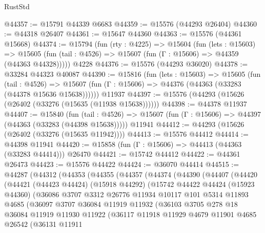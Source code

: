 \begin{lexlean}{RustStd}
\begin{coremodule}
@44357 := @15791 @44339 @6683
@44359 := @15576 (@44293 @26404)
@44360 := @44318 @26407
@44361 := @15647 @44360
@44363 := @15576 (@44361 @15668)
@44374 := @15794
    (fun (rty : @4225) =>
    @15604
      (fun (lets : @15603) =>
      @15605 (fun (tail : @4526) => @15607 (fun (Γ : @15606) => @44359 (@44363 @44328)))))
    @4228
@44376 := @15576 (@44293 @36020)
@44378 := @33284 @44323 @40087
@44390 := @15816
    (fun (lets : @15603) =>
    @15605
      (fun (tail : @4526) =>
      @15607 (fun (Γ : @15606) => @44376 (@44363 (@33283 (@44378 @15636 @15638))))))
    @11937
@44397 := @15576 (@44293 (@15626 (@26402 (@33276 (@15635 (@11938 @15638))))))
@44398 := @44378 @11937
@44407 := @15840
    (fun (tail : @4526) => @15607 (fun (Γ : @15606) => @44397 (@44363 (@33283 (@44398 @15638)))))
    @11941
@44412 := @44293 (@15626 (@26402 (@33276 (@15635 @11942))))
@44413 := @15576 @44412
@44414 := @44398 @11941
@44420 := @15858 (fun (Γ : @15606) => @44413 (@44363 (@33283 @44414))) @26470
@44421 := @15742 @44412
@44422 := @44361 @26473
@44423 := @15576 @44422
@44424 := @36070 @44414
@44515 := @44287
    (@44312
      (@44353
        (@44355
          (@44357
            (@44374
              (@44390
                (@44407
                  (@44420
                    (@44421
                      (@44423 @44424)
                      (@15918 @44292)
                      (@15742
                        @44422
                        @44424
                        (@15923 @44360)
                        (@36086
                          @3707
                          @3312
                          @26776
                          @11934
                          @10117
                          @101
                          @5314
                          @11893
                          @4685
                          (@36097
                            @3707
                            @36084
                            @11919
                            @11932
                            (@36103
                              @3705
                              @278
                              @18
                              @36084
                              @11919
                              @11930
                              @11922
                              (@36117
                                @11918
                                @11929
                                @4679
                                @11901
                                @4685
                                @26542
                                (@36131
                                  @11911

\end{coremodule}
\end{lexlean}
